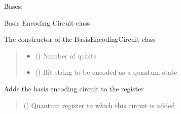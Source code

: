 \documentclass[letterpaper,10pt,english]{sphinxmanual}
\begin{document}
\begin{fulllineitems}
\label{\detokenize{qcompute_qapp.circuit:qcompute_qapp.circuit.BasisEncodingCircuit}}
\pysigstartsignatures
{}
\pysigstopsignatures
\sphinxAtStartPar
Bases: {\hyperref[\detokenize{qcompute_qapp.circuit:qcompute_qapp.circuit.BasicCircuit}]{}}

\sphinxAtStartPar
Basis Encoding Circuit class

\sphinxAtStartPar
The constructor of the BasisEncodingCircuit class
\begin{quote}\begin{description}
\begin{itemize}
\item {} 
\sphinxAtStartPar
{} () \textendash{} Number of qubits

\item {} 
\sphinxAtStartPar
{} () \textendash{} Bit string to be encoded as a quantum state

\end{itemize}

\end{description}\end{quote}

\begin{fulllineitems}
\label{\detokenize{qcompute_qapp.circuit:qcompute_qapp.circuit.BasisEncodingCircuit.add_circuit}}
\pysigstartsignatures
{}
\pysigstopsignatures
\sphinxAtStartPar
Adds the basis encoding circuit to the register
\begin{quote}\begin{description}
\sphinxAtStartPar
{} () \textendash{} Quantum register to which this circuit is added

\end{description}\end{quote}

\end{fulllineitems}


\end{fulllineitems}
\end{document}
